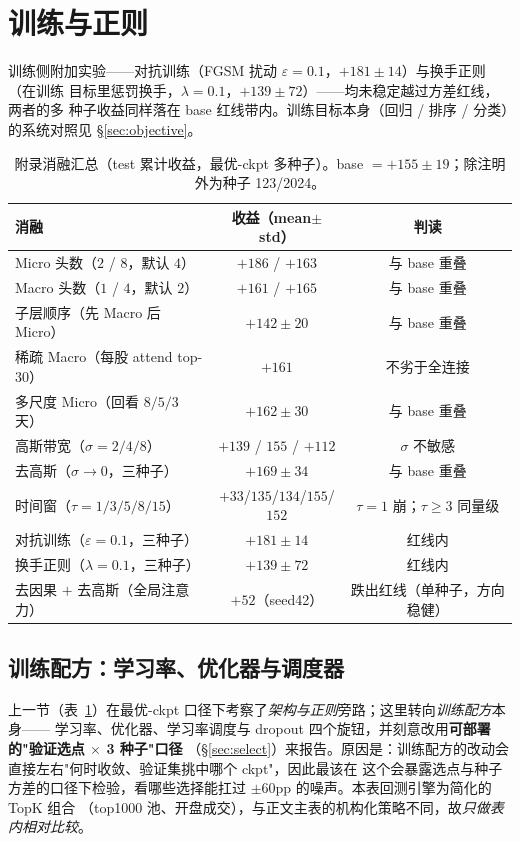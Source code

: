\documentclass[a4paper,11pt,fontset=fandol]{ctexart}
\begin{document}
\section{训练与正则}\label{sec:abl-train}
训练侧附加实验——对抗训练（FGSM 扰动 $\varepsilon{=}0.1$，$+181\pm14$）与换手正则（在训练
目标里惩罚换手，$\lambda{=}0.1$，$+139\pm72$）——均未稳定越过方差红线，两者的多
种子收益同样落在 base 红线带内。训练目标本身（回归 / 排序 / 分类）的系统对照见 §\ref{sec:objective}。

\begin{table}[H]
\centering
\caption{附录消融汇总（test 累计收益，最优-ckpt 多种子）。base $=+155\pm19$；除注明外为种子 123/2024。}
\label{tab:appendix}
\begin{tabular}{lcc}
\toprule
消融 & 收益（mean$\pm$std） & 判读 \\
\midrule
Micro 头数（$2$ / $8$，默认 $4$）   & $+186$ / $+163$ & 与 base 重叠 \\
Macro 头数（$1$ / $4$，默认 $2$）   & $+161$ / $+165$ & 与 base 重叠 \\
子层顺序（先 Macro 后 Micro）       & $+142\pm20$    & 与 base 重叠 \\
稀疏 Macro（每股 attend top-$30$）  & $+161$         & 不劣于全连接 \\
多尺度 Micro（回看 $8/5/3$ 天）     & $+162\pm30$    & 与 base 重叠 \\
高斯带宽（$\sigma{=}2/4/8$）        & $+139$ / $155$ / $+112$ & $\sigma$ 不敏感 \\
去高斯（$\sigma\to0$，三种子）      & $+169\pm34$    & 与 base 重叠 \\
时间窗（$\tau{=}1/3/5/8/15$）       & $+33$/$135$/$134$/$155$/$152$ & $\tau{=}1$ 崩；$\tau\ge3$ 同量级 \\
对抗训练（$\varepsilon{=}0.1$，三种子）& $+181\pm14$  & 红线内 \\
换手正则（$\lambda{=}0.1$，三种子） & $+139\pm72$    & 红线内 \\
去因果 $+$ 去高斯（全局注意力）     & $+52$（seed42） & 跌出红线（单种子，方向稳健） \\
\bottomrule
\end{tabular}
\end{table}

\subsection{训练配方：学习率、优化器与调度器}\label{sec:abl-recipe}
上一节（表~\ref{tab:appendix}）在最优-ckpt 口径下考察了\emph{架构与正则}旁路；这里转向\emph{训练配方}本身——
学习率、优化器、学习率调度与 dropout 四个旋钮，并刻意改用\textbf{\heiti 可部署的"验证选点 $\times$ 3 种子"口径}
（§\ref{sec:select}）来报告。原因是：训练配方的改动会直接左右"何时收敛、验证集挑中哪个 ckpt"，因此最该在
这个会暴露选点与种子方差的口径下检验，看哪些选择能扛过 $\pm60$pp 的噪声。本表回测引擎为简化的 TopK 组合
（top1000 池、开盘成交），与正文主表的机构化策略不同，故\emph{只做表内相对比较}。
\end{document}
